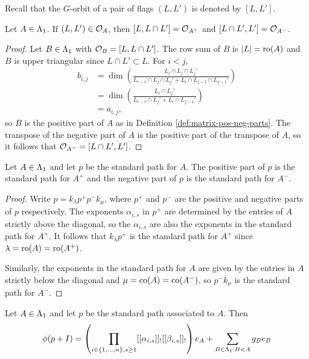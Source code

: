 \documentclass[a4paper, 11pt]{report}
\begin{document}
Recall that the $G$-orbit of a pair of flags $(L,L')$ is denoted by $[L,L']$.

\begin{lemma}\label{lemma:pos-neg-orbits}
Let $A\in\Lambda_1{}$. If $(L,L')\in\mathcal{O}_{A}$, then $[L,L\cap L']=\mathcal{O}_{A^+}$ and $[L\cap L',L']=\mathcal{O}_{A^-}$.
\end{lemma}

\begin{proof}
Let $B\in\Lambda_1{}$ with $\mathcal{O}_{B} = [L,L\cap L']$. The row sum of $B$ is $|L|=\operatorname{ro}(A)$ and $B$ is upper triangular since $L\cap L'\subset L$. For $i<j$,
\begin{align*}
b_{i,j}
&= \dim\left(\frac{L_i\cap L_j\cap L_j'}{L_{i-1}\cap L_j\cap L_j' + L_i\cap L_{j-1}\cap L_{j-1}'}\right)\\
&= \dim\left(\frac{L_i\cap L_j'}{L_{i-1}\cap L_j' + L_i\cap L_{j-1}'}\right)\\
&= a_{i,j},
\end{align*}
so $B$ is the positive part of $A$ as in Definition \ref{def:matrix-pos-neg-parts}. The transpose of the negative part of $A$ is the positive part of the transpose of $A$, so it follows that $\mathcal{O}_{A^-}=[L\cap L',L']$.
\end{proof}

\begin{lemma}\label{lemma:pos-neg-path-to-matrix}
Let $A\in\Lambda_1{}$ and let $p$ be the standard path for $A$. The positive part of $p$ is the standard path for $A^+$ and the negative part of $p$ is the standard path for $A^-$.
\end{lemma}

\begin{proof}
Write $p=k_\lambda p^+ p^-k_\mu$, where $p^+$ and $p^-$ are the positive and negative parts of $p$ respectively. The exponents $\alpha_{i,s}$ in $p^+$ are determined by the entries of $A$ strictly above the diagonal, so the $\alpha_{i,s}$ are also the exponents in the standard path for $A^+$. It follows that $k_\lambda p^+$ is the standard path for $A^+$ since $\lambda=\operatorname{ro}(A)=\operatorname{ro}(A^+)$.

Similarly, the exponents in the standard path for $A$ are given by the entries in $A$ strictly below the diagonal and $\mu=\operatorname{co}(A)=\operatorname{co}(A^-)$, so $p^- k_\mu$ is the standard path for $A^-$.
\end{proof}

\begin{lemma}\label{lemma:image-of-standard-path}
Let $A\in\Lambda_1{}$ and let $p$ be the standard path associated to $A$. Then
\begin{equation*}
\phi(p+I) = \left(\prod_{i\in\{1,\ldots,n\},s\geq 1} [[\alpha_{i,s}]]_![[\beta_{i,s}]]_!\right) e_A + \sum_{B\in\Lambda_1{}:B<A} g_Be_B
\end{equation*}
\end{lemma}
\end{document}
